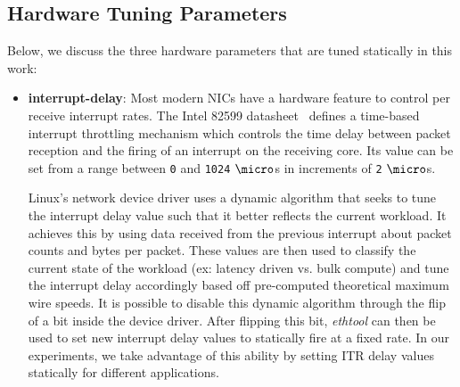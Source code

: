 \subsection{Hardware Tuning Parameters}
Below, we discuss the three hardware parameters that are tuned statically in
this work:
\label{sec:knobs}
\begin{itemize}
\item \textbf{interrupt-delay}: Most modern NICs have a hardware feature to
control per receive interrupt rates.
The Intel 82599 datasheet~\cite{82599} defines a time-based interrupt
throttling mechanism which controls the time delay between packet reception and
the firing of an interrupt on the receiving core.
Its value can be set from a range between \texttt{0} and \texttt{1024}
$\micro$s in increments of \texttt{2} $\micro$s.

Linux's network device driver uses a dynamic algorithm that seeks to tune the
interrupt delay value such that it better reflects the current workload.
It achieves this by using data received from the previous interrupt about
packet counts and bytes per packet.
These values are then used to classify the current state of the workload (ex:
latency driven vs. bulk compute) and tune the interrupt delay accordingly based
off pre-computed theoretical maximum wire speeds.
It is possible to disable this dynamic algorithm through the flip of a bit
inside the device driver. After flipping this bit, \textit{ethtool} can then be
used to set new interrupt delay values to statically fire at a fixed rate.
In our experiments, we take advantage of this ability by setting ITR delay values statically for different applications.




\end{itemize}
